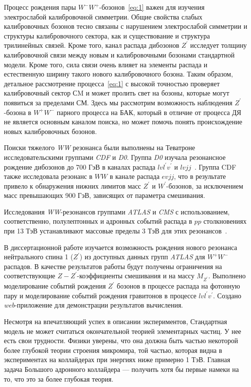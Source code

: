 Процесс рождения пары $W^-W^+$-бозонов~\ref{eq:1} важен для изучения электрослабой калибровочной симметрии. Общие свойства слабых калибровочных бозонов тесно связаны с нарушением электрослабой симметрии и структуры калибровочного сектора, как и существование и структура трилинейных связей. Кроме того, канал распада дибозонов $Z^\prime$ исследует толщину калибровочной связи между новым и калибровочными бозонами стандартной модели. Кроме того, сила связи очень влияет на элементы распада и естественную ширину такого нового калибровочного бозона. Таким образом, детальное рассмотрение процесса~\ref{eq:1} с высокой точностью проверяет калибровочный сектор СM и может пролить свет на бозоны, которые могут появиться за пределами СМ. Здесь мы рассмотрим возможность наблюдения $Z^\prime$-бозона в $W^+W^-$ парного процесса на БАК, который в отличие от процесса ДЯ не является основным каналом поиска, но может помочь понять происхождение новых калибровочных бозонов.

Поиски тяжелого \textit{WW} резонанса были выполнены на Теватроне исследовательскими группами \textit{CDF} и \textit{D0}. Группа \textit{D0} изучала резонансное рождение дибозонов до 700 ГэВ в каналах распада $lvl^\prime v^\prime$ и $lvjj$~\cite{Krasnikov:2004}. Группа CDF также исследовала резонанс в $WW$ в канале распада $evjj$, что в результате привело к обнаружения нижних лимитов масс $Z^\prime$
и $W^\prime$-бозонов, за исключением масс превышающих 900 ГэВ, зависящих от параметра смешивания.

Исследования \textit{WW}-резонансов группами \textit{ATLAS} и \textit{CMS} с использованием, соответственно, полулептонных и адронных событий распада в $pp$ столкновениях при 13 ТэВ устанавливают массовые пределы 3 ТэВ для этих резонансов~\cite{nuclphys:weak}. 

В диссертационной работе изучается возможность рождения нового резонанса нейтрального спина 1 ($Z^\prime$) из доступных данных групп \textit{ATLAS} для $W^+W^-$ распадов. В качестве результатов работы будут получены ограничения на соответствующие $Z-Z^\prime$-коэффициенты смешивания и на массу $M_{Z^\prime}$.
Выполнено моделирование событий рождения $Z^\prime$ бозонов в процессе распада на фотонную пару и моделирование событий рождения гравитонов в процессе $lvl^\prime v^\prime$. Создано \textit{web}-приложение для демонстрации результатов вычисления.

Несмотря на впечатляющий успех в описании экспериментов, Стандартная модель не может считаться окончательной теорией элементарных частиц. У нее есть свои трудности. Физики уверены, что она должна быть частью некоторой более глубокой теории строения микромира, той частью, которая видна в экспериментах на коллайдерах при энергиях ниже примерно 1 ТэВ. Главная задача Большого адронного коллайдера — получить хотя бы первые намеки на то, что это за более глубокая теория.

